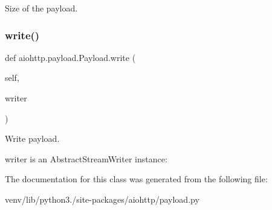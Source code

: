 \begin{DoxyVerb}Size of the payload.\end{DoxyVerb}
 \mbox{\label{classaiohttp_1_1payload_1_1_payload_ab20159ceaa9331365ba283028bf48da8}} 
\subsubsection{\texorpdfstring{write()}{write()}}
{\footnotesize\ttfamily def aiohttp.\+payload.\+Payload.\+write (\begin{DoxyParamCaption}\item[{}]{self,  }\item[{}]{writer }\end{DoxyParamCaption})}

\begin{DoxyVerb}Write payload.

writer is an AbstractStreamWriter instance:
\end{DoxyVerb}
 

The documentation for this class was generated from the following file\+:\begin{DoxyCompactItemize}
\item 
venv/lib/python3./site-\/packages/aiohttp/payload.\+py\end{DoxyCompactItemize}
